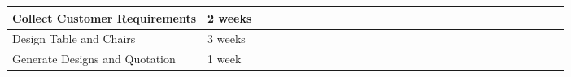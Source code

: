 \begin{table}[!h]
{\begin{tabular}{|l|l|l|l|l|l|l|l|l|l|l|l|l|l|l|l|l|l|l|l|l|l|l|l|l|l|l|l|l|}
            Collect Customer Requirements    & 2 weeks &                          &                          &                          & \cellcolor[HTML]{FD6864} & \cellcolor[HTML]{FD6864} &                          &                          &                          &                          &                          &                          &                          &                          &                          &                          &                          &                          &                          &                          &                          &                          &                          &                          &                          &                          &                          &                          \\ \hline
            Design Table and Chairs          & 3 weeks &                          &                          &                          &                          &                          & \cellcolor[HTML]{FD6864} & \cellcolor[HTML]{FD6864} &                          &                          &                          &                          &                          &                          &                          &                          &                          &                          &                          &                          &                          &                          &                          &                          &                          &                          &                          &                          \\ \hline
            Generate Designs and Quotation   & 1 week  &                          &                          &                          &                          &                          &                          &                          & \cellcolor[HTML]{FD6864} & \cellcolor[HTML]{FD6864} &                          &                          &                          &                          &                          &                          &                          &                          &                          &                          &                          &                          &                          &                          &                          &                          &                          &                          \\ \hline

\end{tabular}}
\end{table}
